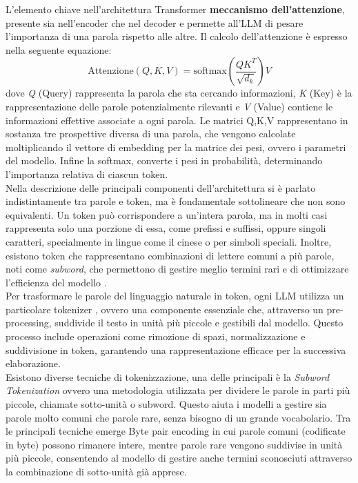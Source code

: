 \documentclass{article}
\begin{document}
L'elemento chiave nell'architettura Transformer \textbf{meccanismo dell'attenzione},  presente sia nell'encoder che nel decoder e permette all'LLM di pesare l'importanza di una parola rispetto alle altre. Il calcolo dell'attenzione è espresso nella seguente equazione\cite{vaswani2017attention}:
\begin{equation}
    \text{Attenzione}(Q, K, V) = \text{softmax}\left(\frac{QK^T}{\sqrt{d_k}}\right) V
\end{equation}
dove \textit{Q} (Query) rappresenta la parola che sta cercando informazioni, \textit{K} (Key) è la rappresentazione delle parole potenzialmente rilevanti e \textit{V} (Value) contiene le informazioni effettive associate a ogni parola. Le matrici Q,K,V rappresentano in sostanza tre prospettive diversa di una parola, che vengono calcolate moltiplicando il vettore di embedding per la matrice dei pesi, ovvero i parametri del modello. Infine la softmax,  converte i pesi in probabilità, determinando l'importanza relativa di ciascun token.\\
Nella descrizione delle principali componenti dell'architettura si è parlato indistintamente tra parole e token, ma è fondamentale sottolineare che non sono equivalenti. Un token può corrispondere a un'intera parola, ma in molti casi rappresenta solo una porzione di essa, come prefissi e suffissi, oppure singoli caratteri, specialmente in lingue come il cinese o per simboli speciali. Inoltre, esistono token che rappresentano combinazioni di lettere comuni a più parole, noti come \textit{subword}, che permettono di gestire meglio termini rari e di ottimizzare l'efficienza del modello \cite{mielke2021wordscharactersbriefhistory}.\\
Per trasformare le parole del linguaggio naturale in token, ogni LLM utilizza un particolare tokenizer \cite{huggingface_transformers_tokenizer}, ovvero una componente essenziale che, attraverso un pre-processing, suddivide il testo in unità più piccole e gestibili dal modello. Questo processo include operazioni come rimozione di spazi, normalizzazione e suddivisione in token, garantendo una rappresentazione efficace per la successiva elaborazione.\\
Esistono diverse tecniche di tokenizzazione, una delle principali è la \textit{Subword Tokenization} ovvero una metodologia utilizzata per dividere le parole in parti più piccole, chiamate sotto-unità o subword. Questo aiuta i modelli a gestire sia parole molto comuni che parole rare, senza bisogno di un grande vocabolario. Tra le principali tecniche emerge Byte pair encoding \cite{Sennrich2015NeuralMT} in cui parole comuni (codificate in byte) possono rimanere intere, mentre parole rare vengono suddivise in unità più piccole, consentendo al modello di gestire anche termini sconosciuti attraverso la combinazione di sotto-unità già apprese.\\
\end{document}
